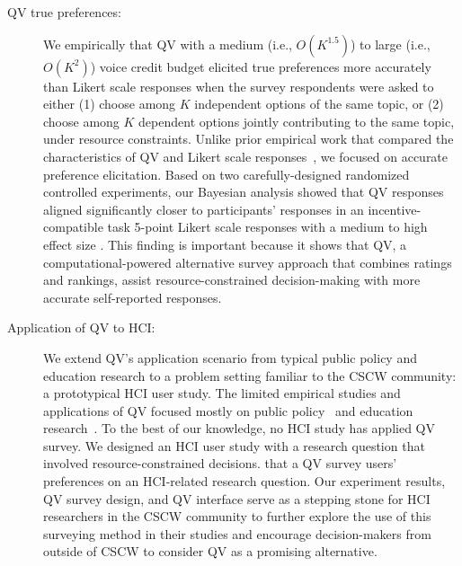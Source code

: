 \begin{description}
\item[QV {} true preferences:] We empirically {} that QV with a medium (i.e., $O(K^{1.5})$) to large (i.e., $O(K^{2})$) voice credit budget elicited true preferences more accurately than Likert scale responses when the survey respondents were asked to either (1) choose among $K$ independent options of the same topic, or (2) choose among $K$ dependent options jointly contributing to the same topic, under resource constraints. Unlike prior empirical work that compared the characteristics of QV and Likert scale responses~\cite{quarfoot2017quadratic, naylor2017first}, we focused on accurate preference elicitation. Based on two carefully-designed randomized controlled experiments, our Bayesian analysis showed that QV responses aligned significantly closer to participants' responses in an incentive-compatible task {} 5-point Likert scale responses with a medium to high effect size {}. This finding is important because it shows that QV, a computational-powered alternative survey approach that combines ratings and rankings, {} assist resource-constrained decision-making with more accurate self-reported responses.

\item[Application of QV to HCI:] We extend QV's application scenario from typical public policy and education research to a problem setting familiar to the CSCW community: a prototypical HCI user study. The limited {} empirical studies and applications of QV focused mostly on public policy~\cite{quarfoot2017quadratic, colorado_qv} and education research~\cite{naylor2017first}. To the best of our knowledge, no {} HCI study has applied QV {} survey. We designed an HCI user study with a research question that involved resource-constrained decisions. {} that a QV survey {} users' preferences on an HCI-related research question. Our experiment results, QV survey design, and QV interface serve as a stepping stone for HCI researchers in the CSCW community to further explore the use of this surveying method in their studies and encourage decision-makers from outside of CSCW to consider QV as a promising alternative.
\end{description}

